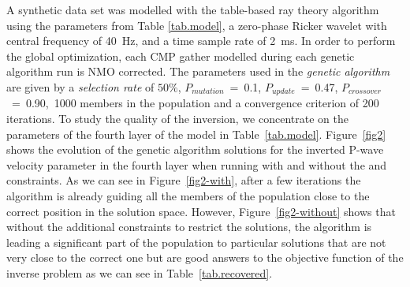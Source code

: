 \documentclass{vie16}
\begin{document}
\vspace{-0.4cm}
A synthetic data set was modelled with the table-based ray theory
algorithm using the parameters from Table \ref{tab.model},
a zero-phase Ricker wavelet with central frequency of 40~Hz, and a time
sample rate of 2~ms. In order to perform the global optimization, each
CMP gather modelled during each genetic algorithm run is NMO corrected.
The parameters used in the \textit{genetic algorithm} are given
by a \textit{selection rate} of $50\%$, $P_{mutation}$~=~0.1,
$P_{update}$~=~0.47, $P_{crossover}$~=~0.90,~1000 members in the
population and a convergence criterion of 200 iterations. To study the quality of the inversion, we concentrate on the
parameters of the fourth
layer of the model in Table~\ref{tab.model}.
Figure~\ref{fig2} shows the evolution of the genetic
algorithm solutions for the inverted P-wave velocity parameter in the
fourth layer when running with and without the
\cite{Gardner1974} and \cite{Castagna1985} constraints. As we
can see in Figure~\ref{fig2-with}, after a few iterations the
algorithm is already guiding all the members of the population
close to the correct position in the solution space.
However, Figure~\ref{fig2-without} shows that without the
additional constraints to restrict the solutions, the
algorithm is leading a significant part of the population to particular solutions
that are not very close to the correct one but are good answers
to the objective function of the inverse problem as we can see in
Table~\ref{tab.recovered}.
\end{document}
